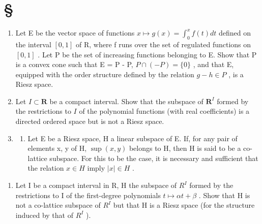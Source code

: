 \section*{\texorpdfstring{\S\CurrentExerciseGroup}{Section \CurrentExerciseGroup}}
{}

\begin{enumerate}
\def\labelenumi{\arabic{enumi})}
\item
  Let E be the vector space of functions \(x \mapsto g(x) = \int_{0}^{x} f(t) dt\) defined on the interval \([0,1]\) of R, where f runs over the set of regulated functions on \([0,1]\) . Let P be the set of increasing functions belonging to E. Show that P is a convex cone such that E = P - P, \(P \cap (-P) = \{0\}\) , and that E, equipped with the order structure defined by the relation \(g - h \in P\) , is a Riesz space.
\item
  Let \(I \subset \mathbf{R}\) be a compact interval. Show that the subspace of \(\mathbf{R}^I\) formed by the restrictions to \(I\) of the polynomial functions (with real coefficients) is a directed ordered space but is not a Riesz space.
\item
  \begin{enumerate}
  \def\labelenumii{\alph{enumii})}
  \tightlist
  \item
    Let E be a Riesz space, H a linear subspace of E. If, for any pair of elements x, y of H, \(\sup(x,y)\) belongs to H, then H is said to be a co-lattice subspace. For this to be the case, it is necessary and sufficient that the relation \(x \in H\) imply \(|x| \in H\) .
  \end{enumerate}
\end{enumerate}

\begin{enumerate}
\def\labelenumi{\alph{enumi})}
\setcounter{enumi}{1}
\tightlist
\item
  Let I be a compact interval in R, H the subspace of \(R^{I}\) formed by the restrictions to I of the first-degree polynomials \(t \mapsto \alpha t + \beta\) . Show that H is not a co-lattice subspace of \(R^{I}\) but that H is a Riesz space (for the structure induced by that of \(R^{I}\) ).
\end{enumerate}

